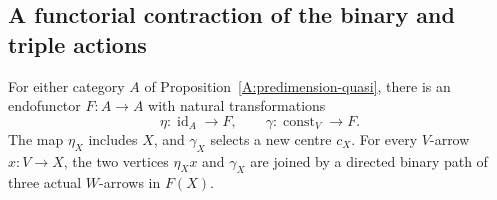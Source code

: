 \subsection{A functorial contraction of the binary and triple actions}

\begin{proposition}
\label{A:predimension-cone-functor}
For either category $A$ of
Proposition~\ref{A:predimension-quasi}, there is an endofunctor
$F:A\to A$ with natural transformations
\[
 \eta:\operatorname{id}_A\longrightarrow F,
 \qquad \gamma:\operatorname{const}_V\longrightarrow F.
\]
The map $\eta_X$ includes $X$, and $\gamma_X$ selects a new centre
$c_X$. For every $V$-arrow $x:V\to X$, the two vertices
$\eta_Xx$ and $\gamma_X$ are joined by a directed binary path of
three actual $W$-arrows in $F(X)$.
\end{proposition}
